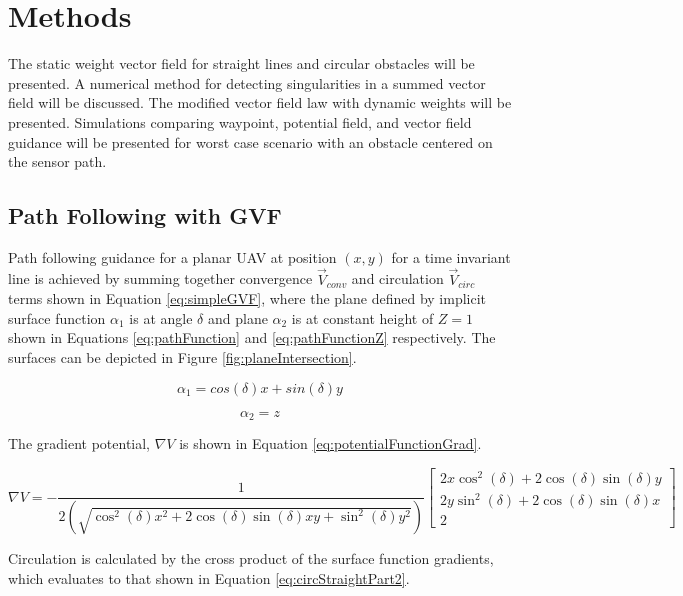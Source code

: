 \documentclass[conf]{new-aiaa}
\begin{document}
\section{Methods}

The static weight vector field for straight lines and circular obstacles will be presented. A numerical method for detecting singularities in a summed vector field will be discussed. The modified vector field law with dynamic weights will be presented. Simulations comparing waypoint, potential field, and vector field guidance will be presented for worst case scenario with an obstacle centered on the sensor path. 

\subsection{Path Following with GVF}
Path following guidance for a planar UAV at position $(x,y)$ for a time invariant line is achieved by summing together convergence $\overrightarrow{V}_{conv}$ and circulation $\overrightarrow{V}_{circ}$ terms shown in Equation \ref{eq:simpleGVF}, where the plane defined by implicit surface function $\alpha_1$ is at angle $\delta$ and plane $\alpha_2$ is at constant height of $Z = 1$ shown in Equations \ref{eq:pathFunction} and \ref{eq:pathFunctionZ} respectively. The surfaces can be depicted in Figure \ref{fig:planeIntersection}.


\begin{equation}
\label{eq:pathFunction}
\alpha_1 = cos(\delta)x + sin(\delta)y
\end{equation}

\begin{equation}
\label{eq:pathFunctionZ}
\alpha_2 = z
\end{equation}

The gradient potential, $\nabla V$ is shown in Equation \ref{eq:potentialFunctionGrad}.

\begin{equation}
\label{eq:potentialFunctionGrad}
\nabla V = -\frac{1}{2(\sqrt{\cos^2(\delta) x^2+2\cos(\delta)\sin(\delta) xy +\sin^2 (\delta) y^2})} \begin{bmatrix}
2x\cos^2(\delta) + 2\cos(\delta)\sin(\delta) y \\
2y\sin^2(\delta) + 2\cos(\delta)\sin(\delta) x \\
2
\end{bmatrix}
\end{equation}

Circulation is calculated by the cross product of the surface function gradients, which evaluates to that shown in Equation \ref{eq:circStraightPart2}.
\end{document}
